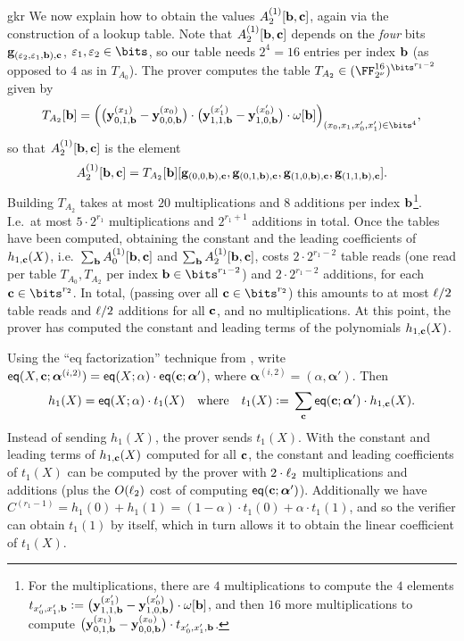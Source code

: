 \begin{lncsappendix}{gkr}
We now explain how to obtain the values $A_2^{(1)}[\mathbf{b},\mathbf{c}]$, again via the construction of a lookup table. Note that $A_2^{(1)}[\mathbf{b},\mathbf{c}]$ depends on the \emph{four} bits $\mathbf{g}_{(\varepsilon_2,\varepsilon_1,\mathbf{b}),\mathbf{c}}$, $\eps_1,\eps_2\in \bits$, so our table  needs $2^4=16$ entries  per  index $\mathbf{b}$ (as opposed to $4$ as in $T_{A_0}$).
The prover  computes the table $T_{A_2}\in (\comfield^{16})^{\bits^{r_1-2}}$ given by
    \begin{equation}\label{e:TA2}T_{A_2}[\bb]=\Big( \big(\yy_{0,1,\bb}^{(x_1)}-\yy_{0,0,\bb}^{(x_0)}\big)\cdot \big(\yy_{1,1,\bb}^{(x_1')}-\yy_{1,0,\bb}^{(x_0')}\big)\cdot \omega[\bb] \Big)_{(x_0,x_1,x_0',x_1')\in \bits^4},\end{equation}
    so that $A_2^{(1)}[\mathbf{b},\mathbf{c}]$ is the element  $$A_2^{(1)}[\mathbf{b},\mathbf{c}]=T_{A_2}[\mathbf{b}][\mathbf{g}_{(0,0,\mathbf{b}),\mathbf{c}},\mathbf{g}_{(0,1,\mathbf{b}),\mathbf{c}},\mathbf{g}_{(1,0,\mathbf{b}),\mathbf{c}},\mathbf{g}_{(1,1,\mathbf{b}),\mathbf{c}}].$$ 
    Building $T_{A_2}$ takes at most $20$ multiplications and $8$ additions per index $\mathbf{b}$\footnote{For the multiplications, there are $4$ multiplications to compute the $4$ elements $t_{x_0',x_1',\mathbf{b}}{\;\vcentcolon=\;} \big(\mathbf{y}_{1,1,\mathbf{b}}^{(x_1')}-\mathbf{y}_{1,0,\mathbf{b}}^{(x_0')}\big)\cdot \omega[\mathbf{b}]$, and then $16$ more multiplications to compute $\big(\mathbf{y}_{0,1,\mathbf{b}}^{(x_1)}-\mathbf{y}_{0,0,\mathbf{b}}^{(x_0)}\big)\cdot t_{x_0',x_1',\mathbf{b}}$.}. I.e.\ at most $5\cdot 2^{r_1}$ multiplications and $2^{r_1+1}$ additions in total.
 Once the tables have been computed, obtaining the constant and the leading coefficients of $h_{1,\mathbf{c}}(X)$, i.e.\ $\sum_{\mathbf{b}} A_0^{(1)}[\mathbf{b},\mathbf{c}]$ and $\sum_{\mathbf{b}} A_2^{(1)}[\mathbf{b},\mathbf{c}]$,  costs $2\cdot 2^{r_1-2}$ table reads (one read per table $T_{A_0}, T_{A_2}$ per index $\bb\in \bits^{r_1-2}$) and $2\cdot 2^{r_1-2}$ additions, for each $\cc\in \bits^{r_2}$. In total, (passing over all $\cc\in \bits^{r_2}$) this amounts  to at most  
 $\ell/2$ table reads and $\ell/2$ additions for all $\mathbf{c}$, and no multiplications. At this point, the prover has computed the constant and leading terms of  the polynomials $h_{1,\mathbf{c}}(X)$. 



Using the ``eq factorization'' technique from \cite{gruen}, write   $\mathsf{eq}(X,\mathbf{c};\bm{\alpha}^{(i,2)})=\mathsf{eq}(X;\alpha)\cdot \mathsf{eq}(\mathbf{c};\bm{\alpha}')$, where $\bm{\alpha}^{(i,2)}=(\alpha,\bm{\alpha}')$. Then 
$$h_1(X)=\mathsf{eq}(X;\alpha)\cdot t_1(X) \quad  \text{where} \quad t_1(X){\;\vcentcolon=\;}\sum_{\mathbf{c}}\mathsf{eq}(\mathbf{c};\bm{\alpha}')\cdot h_{1,\mathbf{c}}(X).$$ 
Instead of sending $h_1(X)$, the prover sends $t_1(X)$. With the constant and leading terms of $h_{1,\mathbf{c}}(X)$ computed for all $\mathbf{c}$,  the constant and leading coefficients of $t_1(X)$ can be computed by the prover with $2\cdot\ell_2$ multiplications and additions (plus the $O(\ell_2)$ cost of computing $\mathsf{eq}(\mathbf{c};\bm{\alpha}')$). Additionally we have $C^{(r_1-1)} = h_1(0)+h_1(1)=(1-\alpha)\cdot t_1(0)+\alpha\cdot t_1(1)$, and so the verifier can obtain $t_1(1)$ by itself, which in turn allows it to obtain the linear coefficient of $t_1(X)$. 




\end{lncsappendix}

